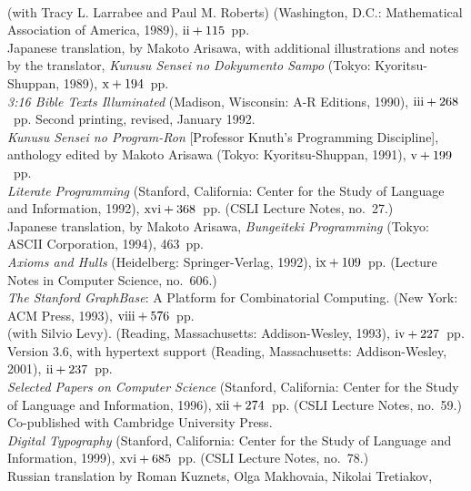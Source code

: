 \yyskip
\\(with Tracy L. Larrabee and Paul M. Roberts) (Washington, D.C.: Mathematical Association of America, 1989),
 $\rm ii+115$~pp.
\\Japanese translation, by Makoto Arisawa, with additional illustrations
 and notes by the translator, {\sl Kunusu Sensei no Dokyumento Sampo\/}
 (Tokyo: Kyoritsu-Shuppan, 1989), $\rm x+194$~pp.
\yyskip
\\{\sl 3:16 Bible Texts Illuminated\/} (Madison, Wisconsin: A-R Editions,
 1990), $\rm iii+268$~pp.
 Second printing, revised, January 1992.
\yyskip
\\{\sl Kunusu Sensei no Program-Ron\/} [Professor Knuth's Programming
 Discipline], anthology edited by Makoto Arisawa (Tokyo: Kyoritsu-Shuppan,
 1991), $\rm v+199$~pp.
\yyskip
\\{\sl Literate Programming\/} (Stanford, California:
 Center for the Study of Language and Information, 1992), $\rm xvi+368$~pp.
 (CSLI Lecture Notes, no.~27.)
\\Japanese translation, by Makoto Arisawa, {\sl Bungeiteki Programming\/}
 (Tokyo: ASCII Corporation, 1994), 463~pp.
\yyskip
\\{\sl Axioms and Hulls\/} (Heidelberg: Springer-Verlag, 1992),
 $\rm ix+109$~pp. (Lecture Notes in Computer Science, no.~606.)
\yyskip
\\{\sl The Stanford GraphBase\/}: A Platform for Combinatorial Computing.
 (New York: ACM Press, 1993), $\rm viii+576$~pp.
\yyskip
\\(with Silvio Levy).
 (Reading, Massachusetts: Addison-Wesley, 1993), $\rm iv+227$~pp.
\\Version 3.6, with hypertext support (Reading, Massachusetts: Addison-Wesley,
 2001), $\rm ii+237$~pp.
\yyskip
\\{\sl Selected Papers on Computer Science\/} (Stanford, California:
 Center for the Study of Language and Information, 1996), $\rm xii+274$~pp.
 (CSLI Lecture Notes, no.~59.) Co-published with Cambridge University Press.
\yyskip
\\{\sl Digital Typography\/} (Stanford, California:
 Center for the Study of Language and Information, 1999), $\rm xvi+685$~pp.
 (CSLI Lecture Notes, no.~78.)
\\Russian translation by Roman Kuznets, Olga Makhovaia, Nikolai Tretiakov,
